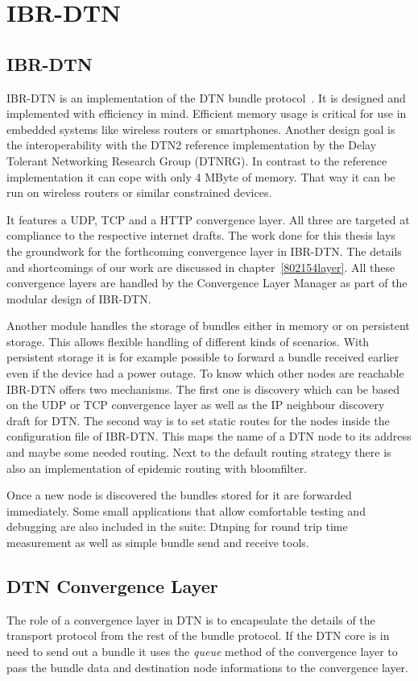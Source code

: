 \chapter{IBR-DTN}
\label{ibr-dtn}
\section{IBR-DTN}

IBR-DTN is an implementation of the DTN bundle protocol~\cite{RFC5050}. It is
designed and implemented with efficiency in mind. Efficient memory usage is critical
for use in embedded systems like wireless routers or smartphones. Another design
goal is the interoperability with the DTN2 reference implementation by the Delay
Tolerant Networking Research Group (DTNRG). In contrast to the reference
implementation it can cope with only 4 MByte of memory. That way it can be run
on wireless routers or similar constrained devices.

It features a UDP, TCP and a HTTP convergence layer. All three are targeted at
compliance to the respective internet drafts. The work done for this thesis lays
the groundwork for the forthcoming convergence layer in IBR-DTN. The details and
shortcomings of our work are discussed in chapter~\ref{802154layer}. All these
convergence layers are handled by the Convergence Layer Manager as part of the
modular design of IBR-DTN.

Another module handles the storage of bundles either in memory or on persistent
storage. This allows flexible handling of different kinds of scenarios. With
persistent storage it is for example possible to forward a bundle received earlier
even if the device had a power outage. To know which other nodes are reachable
IBR-DTN offers two mechanisms. The first one is discovery which can be based on
the UDP or TCP convergence layer as well as the IP neighbour discovery draft for
DTN. The second way is to set static routes for the nodes inside the
configuration file of IBR-DTN. This maps the name of a DTN node to its address
and maybe some needed routing. Next to the default routing strategy there is
also an implementation of epidemic routing with bloomfilter.

Once a new node is discovered the bundles stored for it are forwarded immediately.
Some small applications that allow comfortable testing and debugging are also
included in the suite: Dtnping for round trip time measurement as well as simple
bundle send and receive tools.

\section{DTN Convergence Layer}
The role of a convergence layer in DTN is to encapsulate the details of the
transport protocol from the rest of the bundle protocol. If the DTN core is in
need to send out a bundle it uses the \emph{queue} method of the convergence
layer to pass the bundle data and destination node informations to the
convergence layer.


